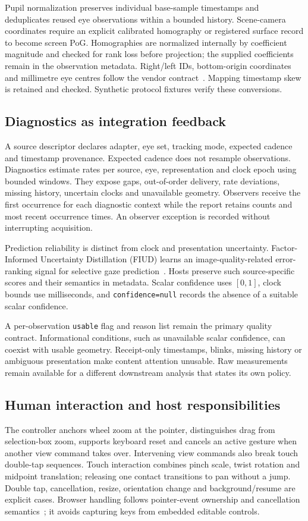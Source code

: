 \documentclass[sigconf,screen,nonacm]{acmart}
\newcommand{\code}[1]{\texttt{#1}}
\begin{document}
Pupil normalization preserves individual base-sample timestamps and deduplicates
reused eye observations within a bounded history. Scene-camera coordinates require an explicit calibrated homography or
registered surface record to become screen PoG. Homographies are normalized
internally by coefficient magnitude and checked for rank loss before projection;
the supplied coefficients remain in the observation metadata. Right/left IDs, bottom-origin coordinates and millimetre eye
centres follow the vendor contract~\cite{pupil}. Mapping timestamp skew is
retained and checked. Synthetic protocol fixtures verify these conversions.

\subsection{Diagnostics as integration feedback}
A source descriptor declares adapter, eye set, tracking mode, expected cadence
and timestamp provenance. Expected cadence does not resample observations.
Diagnostics estimate rates per source, eye, representation and clock epoch
using bounded windows. They expose gaps, out-of-order delivery, rate deviations,
missing history, uncertain clocks and unavailable geometry. Observers receive
the first occurrence for each diagnostic context while the report retains counts
and most recent occurrence times. An observer exception is recorded without
interrupting acquisition.

Prediction reliability is distinct from clock and presentation uncertainty.
Factor-Informed Uncertainty Distillation (FIUD) learns an image-quality-related
error-ranking signal for selective gaze prediction~\cite{fiud}. Hosts preserve
such source-specific scores and their semantics in metadata. Scalar confidence
uses $[0,1]$, clock bounds use milliseconds, and \code{confidence=null} records
the absence of a suitable scalar confidence.

A per-observation \code{usable} flag and reason list remain the primary quality
contract. Informational conditions, such as unavailable scalar confidence, can
coexist with usable geometry. Receipt-only timestamps, blinks, missing history
or ambiguous presentation make content attention unusable. Raw measurements
remain available for a different downstream analysis that states its own policy.

\subsection{Human interaction and host responsibilities}
The controller anchors wheel zoom at the pointer, distinguishes drag from
selection-box zoom, supports keyboard reset and cancels an active gesture when
another view command takes over. Intervening view commands also break touch
double-tap sequences. Touch interaction combines pinch scale, twist rotation
and midpoint translation; releasing one contact transitions to pan without a
jump. Double tap, cancellation, resize, orientation change and background/resume
are explicit cases. Browser handling follows pointer-event ownership and
cancellation semantics~\cite{pointerevents}; it avoids capturing keys from
embedded editable controls.
\end{document}
